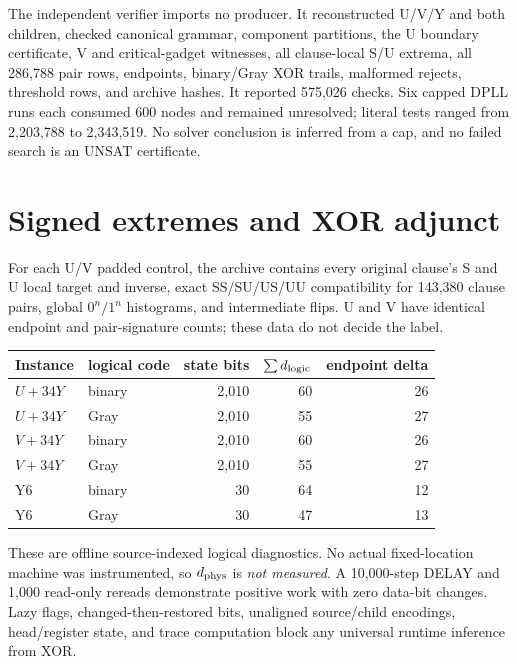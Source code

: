 \documentclass[11pt]{article}
\begin{document}
The independent verifier imports no producer.  It reconstructed U/V/Y and both children, checked canonical grammar, component partitions, the U boundary certificate, V and critical-gadget witnesses, all clause-local S/U extrema, all 286,788 pair rows, endpoints, binary/Gray XOR trails, malformed rejects, threshold rows, and archive hashes.  It reported 575,026 checks.  Six capped DPLL runs each consumed 600 nodes and remained unresolved; literal tests ranged from 2,203,788 to 2,343,519.  No solver conclusion is inferred from a cap, and no failed search is an UNSAT certificate.

\section{Signed extremes and XOR adjunct}
For each U/V padded control, the archive contains every original clause's S and U local target and inverse, exact SS/SU/US/UU compatibility for 143,380 clause pairs, global $0^n/1^n$ histograms, and intermediate flips.  U and V have identical endpoint and pair-signature counts; these data do not decide the label.

\begin{center}
\begin{tabular}{llrrr}
\toprule
Instance & logical code & state bits & $\sum d_{\rm logic}$ & endpoint delta\\
\midrule
$U+34Y$ & binary & 2,010 & 60 & 26\\
$U+34Y$ & Gray   & 2,010 & 55 & 27\\
$V+34Y$ & binary & 2,010 & 60 & 26\\
$V+34Y$ & Gray   & 2,010 & 55 & 27\\
Y6      & binary & 30 & 64 & 12\\
Y6      & Gray   & 30 & 47 & 13\\
\bottomrule
\end{tabular}
\end{center}
These are offline source-indexed logical diagnostics.  No actual fixed-location machine was instrumented, so $d_{\rm phys}$ is \emph{not measured}.  A 10,000-step DELAY and 1,000 read-only rereads demonstrate positive work with zero data-bit changes.  Lazy flags, changed-then-restored bits, unaligned source/child encodings, head/register state, and trace computation block any universal runtime inference from XOR.
\end{document}
